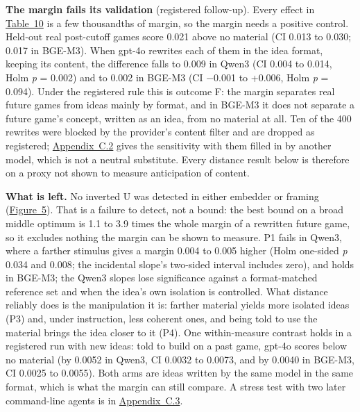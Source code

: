 \documentclass[
  10pt,
]{article}
\begin{document}
\textbf{The margin fails its validation}
(registered follow-up). Every effect in
\hyperref[tab:10]{Table~10} is a few
thousandths of margin, so the margin
needs a positive control. Held-out real
post-cutoff games score 0.021 above no
material (CI 0.013 to 0.030; 0.017 in
BGE-M3). When gpt-4o rewrites each of
them in the idea format, keeping its
content, the difference falls to 0.009
in Qwen3 (CI 0.004 to 0.014, Holm
\emph{p} = 0.002) and to 0.002 in BGE-M3
(CI −0.001 to +0.006, Holm \emph{p} =
0.094). Under the registered rule this
is outcome F: the margin separates real
future games from ideas mainly by
format, and in BGE-M3 it does not
separate a future game's concept,
written as an idea, from no material at
all. Ten of the 400 rewrites were
blocked by the provider's content filter
and are dropped as registered;
\hyperref[app:C.2]{Appendix~C.2} gives
the sensitivity with them filled in by
another model, which is not a neutral
substitute. Every distance result below
is therefore on a proxy not shown to
measure anticipation of content.

\textbf{What is left.} No inverted U was
detected in either embedder or framing
(\hyperref[fig:5]{Figure~5}). That is a
failure to detect, not a bound: the best
bound on a broad middle optimum is 1.1
to 3.9 times the whole margin of a
rewritten future game, so it excludes
nothing the margin can be shown to
measure. P1 fails in Qwen3, where a
farther stimulus gives a margin 0.004 to
0.005 higher (Holm one-sided \emph{p}
0.034 and 0.008; the incidental slope's
two-sided interval includes zero), and
holds in BGE-M3; the Qwen3 slopes lose
significance against a format-matched
reference set and when the idea's own
isolation is controlled. What distance
reliably does is the manipulation it is:
farther material yields more isolated
ideas (P3) and, under instruction, less
coherent ones, and being told to use the
material brings the idea closer to it
(P4). One within-measure contrast holds
in a registered run with new ideas: told
to build on a past game, gpt-4o scores
below no material (by 0.0052 in Qwen3,
CI 0.0032 to 0.0073, and by 0.0040 in
BGE-M3, CI 0.0025 to 0.0055). Both arms
are ideas written by the same model in
the same format, which is what the
margin can still compare. A stress test
with two later command-line agents is in
\hyperref[app:C.3]{Appendix~C.3}.
\end{document}
